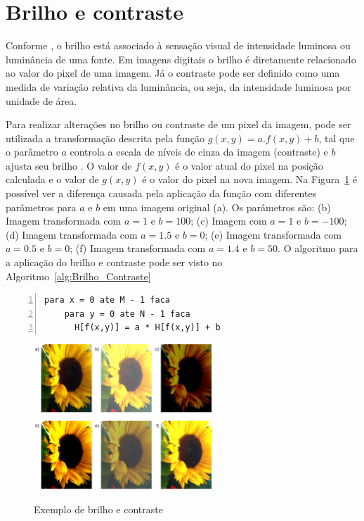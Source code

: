 \documentclass[12pt,oneside,a4paper,english,french,spanish,brazil,]{abntex2}
\begin{document}
\section{Brilho e contraste}

Conforme \citet{pedrini:2008}, o brilho está associado à sensação visual de intensidade luminosa ou luminância de uma fonte. Em imagens digitais o brilho é diretamente relacionado ao valor do pixel de uma imagem. Já o contraste pode ser definido como uma medida de variação relativa da luminância, ou seja, da intensidade luminosa por unidade de área.

Para realizar alterações no brilho ou contraste de um pixel da imagem, pode ser utilizada a transformação descrita pela função \(g(x,y)=a.f(x,y)+b\), tal que o parâmetro \(a\) controla a escala de níveis de cinza da imagem (contraste) e \(b\) ajusta seu brilho \cite{pedrini:2008}. O valor de \(f(x,y)\) é o valor atual do pixel na posição calculada e o valor de \(g(x,y)\) é o valor do pixel na nova imagem. Na Figura~\ref{fig:PDI_Brilho_e_Contraste} é possível ver a diferença causada pela aplicação da função com diferentes parâmetros para \(a\) e \(b\) \cite{pedrini:2008} em uma imagem original (a). Os parâmetros são: (b) Imagem transformada com \(a=1\) e \(b=100\); (c) Imagem com \(a=1\) e \(b=-100\); (d) Imagem transformada com \(a=1.5\) e \(b=0\); (e) Imagem transformada com \(a=0.5\) e \(b=0\); (f) Imagem transformada com \(a=1.4\) e \(b=50\). O algoritmo para a aplicação do brilho e contraste pode ser visto no Algoritmo~\ref{alg:Brilho_Contraste} 

\begin{minipage}{\linewidth}
\begin{lstlisting}[caption={Algoritmo para aplicação de brilho e contraste}, label=alg:Brilho_Contraste, numbers=left]
para x = 0 ate M - 1 faca
    para y = 0 ate N - 1 faca
      H[f(x,y)] = a * H[f(x,y)] + b
\end{lstlisting}
\end{minipage}

\begin{figure}[ht]
\centering
\caption{Exemplo de brilho e contraste}
\includegraphics[width=0.6\textwidth]{imagens/PDI_Brilho_e_Contraste.pdf}
\sourceAuthor
\label{fig:PDI_Brilho_e_Contraste}
\end{figure}
\end{document}
